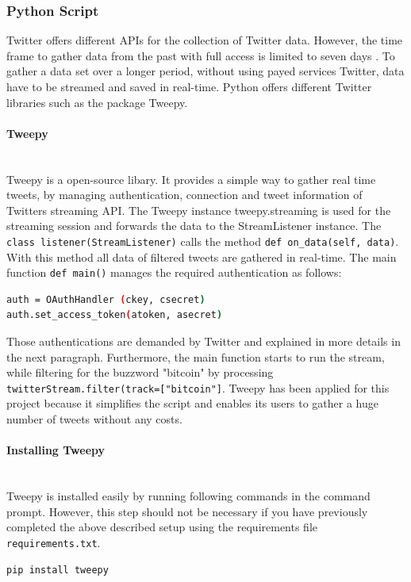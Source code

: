 \documentclass[a4paper,12pt]{article}
\begin{document}
\begin{spacing}{1.2}
\subsubsection{Python Script}
Twitter offers different APIs for the collection of Twitter data. However, the time frame to gather data from the past with full access is limited to seven days \parencite{twitterinc2017a}. To gather a data set over a longer period, without using payed services Twitter, data have to be streamed and saved in real-time. Python offers different Twitter libraries such as the package Tweepy.

\paragraph{Tweepy}\mbox{}\\{}
Tweepy is a open-source libary. It provides a simple way to gather real time tweets, by managing authentication, connection and tweet information of Twitters streaming API. The Tweepy instance tweepy.streaming is used for the streaming session and forwards the data to the StreamListener instance. The \verb|class listener(StreamListener)| calls the method \verb|def on_data(self, data)|. With this method all data of filtered tweets are gathered in real-time. \parencite{tweepy} The main function \verb|def main()| manages the required authentication as follows:
\begin{lstlisting}[language=bash]
auth = OAuthHandler (ckey, csecret)
auth.set_access_token(atoken, asecret)
\end{lstlisting}
Those authentications are demanded by Twitter and explained in more details in the next paragraph. Furthermore, the main function starts to run the stream, while filtering for the buzzword "bitcoin" by processing \verb|twitterStream.filter(track=["bitcoin"]|. Tweepy has been applied for this project because it simplifies the script and enables its users to gather a huge number of tweets without any costs. 


\paragraph{Installing Tweepy}\mbox{}\\{}
Tweepy is installed easily by running following commands in the command prompt. However, this step should not be necessary if you have previously completed the above described setup using the requirements file \verb|requirements.txt|.
\begin{lstlisting}[language=bash]
pip install tweepy
\end{lstlisting}


\end{spacing}
\end{document}

